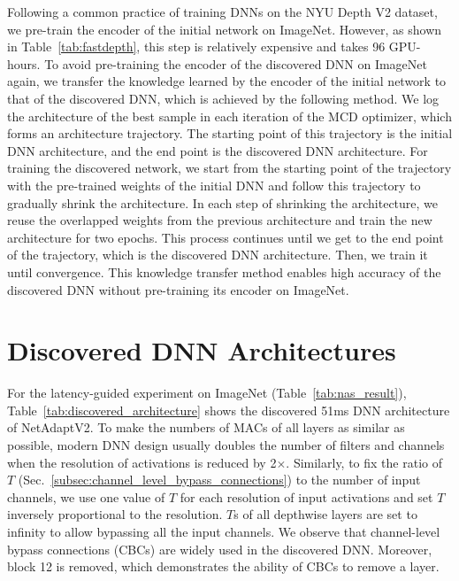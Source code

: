 Following a common practice of training DNNs on the NYU Depth V2 dataset, we pre-train the encoder of the initial network on ImageNet. However, as shown in Table~\ref{tab:fastdepth}, this step is relatively expensive and takes 96 GPU-hours. To avoid pre-training the encoder of the discovered DNN on ImageNet again, we transfer the knowledge learned by the encoder of the initial network to that of the discovered DNN, which is achieved by the following method. We log the architecture of the best sample in each iteration of the MCD optimizer, which forms an architecture trajectory. The starting point of this trajectory is the initial DNN architecture, and the end point is the discovered DNN architecture. For training the discovered network, we start from the starting point of the trajectory with the pre-trained weights of the initial DNN and follow this trajectory to gradually shrink the architecture. In each step of shrinking the architecture, we reuse the overlapped weights from the previous architecture and train the new architecture for two epochs. This process continues until we get to the end point of the trajectory, which is the discovered DNN architecture. Then, we train it until convergence. This knowledge transfer method enables high accuracy of the discovered DNN without pre-training its encoder on ImageNet.


\section{Discovered DNN Architectures}

For the latency-guided experiment on ImageNet (Table~\ref{tab:nas_result}), Table~\ref{tab:discovered_architecture} shows the discovered 51ms DNN architecture of NetAdaptV2. To make the numbers of MACs of all layers as similar as possible, modern DNN design usually doubles the number of filters and channels when the resolution of activations is reduced by 2$\times$. Similarly, to fix the ratio of $T$ (Sec.~\ref{subsec:channel_level_bypass_connections}) to the number of input channels, we use one value of $T$ for each resolution of input activations and set $T$ inversely proportional to the resolution. $T$s of all depthwise layers are set to infinity to allow bypassing all the input channels. We observe that channel-level bypass connections (CBCs) are widely used in the discovered DNN. Moreover, block 12 is removed, which demonstrates the ability of CBCs to remove a layer.

